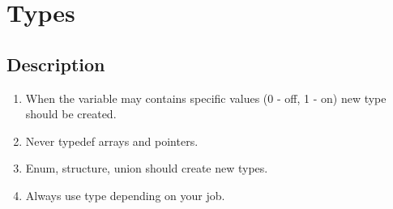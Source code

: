 \section{Types}
\subsection{Description}
\begin{enumerate}
    \item When the variable may contains specific values (0 - off, 1 - on) new type should be created.
    \item Never typedef arrays and pointers.
    \item Enum, structure, union should create new types.
    \item Always use type depending on your job.
\end{enumerate}

